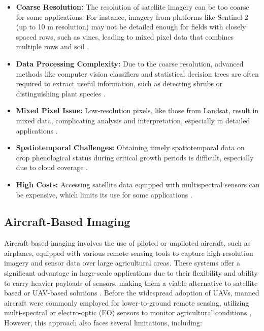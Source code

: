 \begin{itemize}
    \item \textbf{Coarse Resolution:} The resolution of satellite imagery can be too coarse for some applications. For instance, imagery from platforms like Sentinel-2 (up to 10 m resolution) may not be detailed enough for fields with closely spaced rows, such as vines, leading to mixed pixel data that combines multiple rows and soil \parencite{adao2017hyperspectral}.
    
    \item \textbf{Data Processing Complexity:} Due to the coarse resolution, advanced methods like computer vision classifiers and statistical decision trees are often required to extract useful information, such as detecting shrubs or distinguishing plant species \parencite{phang2023from}.
    
    \item \textbf{Mixed Pixel Issue:} Low-resolution pixels, like those from Landsat, result in mixed data, complicating analysis and interpretation, especially in detailed applications \parencite{delavarpour2021technical}.
    
    \item \textbf{Spatiotemporal Challenges:} Obtaining timely spatiotemporal data on crop phenological status during critical growth periods is difficult, especially due to cloud coverage \parencite{delavarpour2021technical}.
    
    \item \textbf{High Costs:} Accessing satellite data equipped with multispectral sensors can be expensive, which limits its use for some applications \parencite{delavarpour2021technical}.
  \end{itemize}
  

\subsection{Aircraft-Based Imaging}

Aircraft-based imaging involves the use of piloted or unpiloted aircraft, such as airplanes, equipped with various remote sensing tools to capture high-resolution imagery and sensor data over large agricultural areas. These systems offer a significant advantage in large-scale applications due to their flexibility and ability to carry heavier payloads of sensors, making them a viable alternative to satellite-based or UAV-based solutions \parencite{delavarpour2021technical}.
Before the widespread adoption of UAVs, manned aircraft were commonly employed for lower-to-ground remote sensing, utilizing multi-spectral or electro-optic (EO) sensors to monitor agricultural conditions \parencite{phang2023satellite}, However, this approach also faces several limitations, including:

